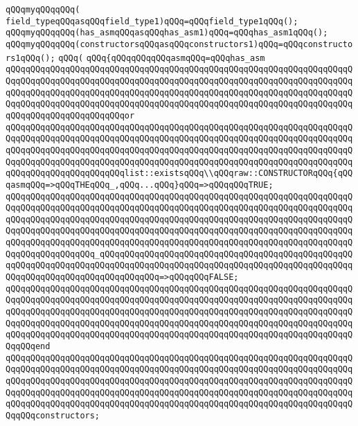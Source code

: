 \verb|qQQqmyqQQqqQQq(|\newline
\verb|field_typeqQQqasqQQqfield_type1)qQQq=qQQqfield_type1qQQq();|\newline
\verb|qQQqmyqQQqqQQq(has_asmqQQqasqQQqhas_asm1)qQQq=qQQqhas_asm1qQQq();|\newline
\verb|qQQqmyqQQqqQQq(constructorsqQQqasqQQqconstructors1)qQQq=qQQqconstructors1qQQq();|\newline
\verb|qQQq(|\newline
\verb|qQQq{qQQqqQQqqQQqasmqQQq=qQQqhas_asm|\newline
\verb|qQQqqQQqqQQqqQQqqQQqqQQqqQQqqQQqqQQqqQQqqQQqqQQqqQQqqQQqqQQqqQQqqQQqqQQqqQQqqQQqqQQqqQQqqQQqqQQqqQQqqQQqqQQqqQQqqQQqqQQqqQQqqQQqqQQqqQQqqQQqqQQqqQQqqQQqqQQqqQQqqQQqqQQqqQQqqQQqqQQqqQQqqQQqqQQqqQQqqQQqqQQqqQQqqQQqqQQqqQQqqQQqqQQqqQQqqQQqqQQqqQQqqQQqqQQqqQQqqQQqqQQqqQQqqQQqqQQqqQQqqQQqqQQqqQQqqQQqqQQqqQQqor|\newline
\verb|qQQqqQQqqQQqqQQqqQQqqQQqqQQqqQQqqQQqqQQqqQQqqQQqqQQqqQQqqQQqqQQqqQQqqQQqqQQqqQQqqQQqqQQqqQQqqQQqqQQqqQQqqQQqqQQqqQQqqQQqqQQqqQQqqQQqqQQqqQQqqQQqqQQqqQQqqQQqqQQqqQQqqQQqqQQqqQQqqQQqqQQqqQQqqQQqqQQqqQQqqQQqqQQqqQQqqQQqqQQqqQQqqQQqqQQqqQQqqQQqqQQqqQQqqQQqqQQqqQQqqQQqqQQqqQQqqQQqqQQqqQQqqQQqqQQqqQQqqQQqqQQqlist::existsqQQq\\qQQqraw::CONSTRUCTORqQQq{qQQqasmqQQq=>qQQqTHEqQQq_,qQQq...qQQq}qQQq=>qQQqqQQqTRUE;|\newline
\verb|qQQqqQQqqQQqqQQqqQQqqQQqqQQqqQQqqQQqqQQqqQQqqQQqqQQqqQQqqQQqqQQqqQQqqQQqqQQqqQQqqQQqqQQqqQQqqQQqqQQqqQQqqQQqqQQqqQQqqQQqqQQqqQQqqQQqqQQqqQQqqQQqqQQqqQQqqQQqqQQqqQQqqQQqqQQqqQQqqQQqqQQqqQQqqQQqqQQqqQQqqQQqqQQqqQQqqQQqqQQqqQQqqQQqqQQqqQQqqQQqqQQqqQQqqQQqqQQqqQQqqQQqqQQqqQQqqQQqqQQqqQQqqQQqqQQqqQQqqQQqqQQqqQQqqQQqqQQqqQQqqQQqqQQqqQQqqQQqqQQqqQQqqQQqqQQqqQQqqQQqqQQqqQQq_qQQqqQQqqQQqqQQqqQQqqQQqqQQqqQQqqQQqqQQqqQQqqQQqqQQqqQQqqQQqqQQqqQQqqQQqqQQqqQQqqQQqqQQqqQQqqQQqqQQqqQQqqQQqqQQqqQQqqQQqqQQqqQQqqQQqqQQqqQQqqQQqqQQqqQQq=>qQQqqQQqFALSE;|\newline
\verb|qQQqqQQqqQQqqQQqqQQqqQQqqQQqqQQqqQQqqQQqqQQqqQQqqQQqqQQqqQQqqQQqqQQqqQQqqQQqqQQqqQQqqQQqqQQqqQQqqQQqqQQqqQQqqQQqqQQqqQQqqQQqqQQqqQQqqQQqqQQqqQQqqQQqqQQqqQQqqQQqqQQqqQQqqQQqqQQqqQQqqQQqqQQqqQQqqQQqqQQqqQQqqQQqqQQqqQQqqQQqqQQqqQQqqQQqqQQqqQQqqQQqqQQqqQQqqQQqqQQqqQQqqQQqqQQqqQQqqQQqqQQqqQQqqQQqqQQqqQQqqQQqqQQqqQQqqQQqqQQqqQQqqQQqqQQqqQQqqQQqqQQqqQQqqQQqqQQqend|\newline
\verb|qQQqqQQqqQQqqQQqqQQqqQQqqQQqqQQqqQQqqQQqqQQqqQQqqQQqqQQqqQQqqQQqqQQqqQQqqQQqqQQqqQQqqQQqqQQqqQQqqQQqqQQqqQQqqQQqqQQqqQQqqQQqqQQqqQQqqQQqqQQqqQQqqQQqqQQqqQQqqQQqqQQqqQQqqQQqqQQqqQQqqQQqqQQqqQQqqQQqqQQqqQQqqQQqqQQqqQQqqQQqqQQqqQQqqQQqqQQqqQQqqQQqqQQqqQQqqQQqqQQqqQQqqQQqqQQqqQQqqQQqqQQqqQQqqQQqqQQqqQQqqQQqqQQqqQQqqQQqqQQqqQQqqQQqqQQqqQQqqQQqqQQqqQQqqQQqqQQqconstructors;|\newline
